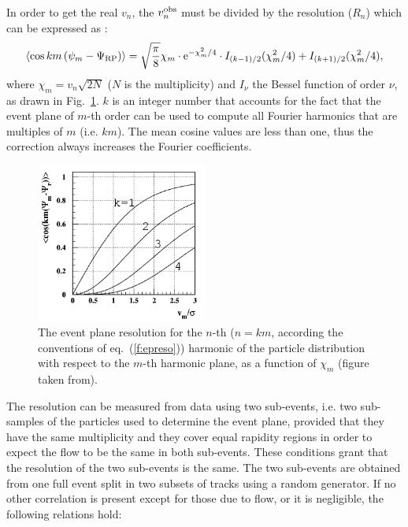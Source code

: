 In order to get  the real $v_n$, the  $v_n^{\rm obs}$ must be divided by the resolution ($R_n$) which can be expressed as \cite{Poskanzer:1998yz}:
\begin{equation}
\label{f:epreso}
\left\langle \cos km\left( \psi_m-\Psi_{\rm RP}\right)\right\rangle = \sqrt{\dfrac{\pi }{8}} \chi_m \cdot {\rm e}^{-\chi_m^2/4} \cdot I_{(k-1)/2}(\chi_m^2/4)+I_{(k+1)/2}(\chi_m^2/4),
\end{equation}
where $\chi_m=v_n\sqrt{2N}$ ($N$ is the multiplicity) and $I_\nu$ the Bessel function of order $\nu$, as drawn in Fig.~\ref{fig:resoBessel}.
$k$ is an integer number that accounts for the fact that the event plane of $m$-th order can be used to compute all Fourier harmonics that are multiples
of $m$ (i.e. $km$).
The mean cosine values are less than one, thus the correction always increases the Fourier coefficients.

\begin{figure}
\centering
 \includegraphics[width=0.5\textwidth]{FigCap5/resolBessel.png}
 \caption[Event plane resolution vs $\chi_m$]{The event plane resolution for the $n$-th ($n=km$, according the conventions of eq.~(\ref{f:epreso})) harmonic of the particle distribution with respect to the $m$-th harmonic plane, as a function of $\chi_m$ (figure taken from).}
 \label{fig:resoBessel}
\end{figure}

The resolution can be measured from data using two sub-events, i.e. two
sub-samples of the particles used to determine the event plane,
provided that they have the same multiplicity and they cover equal rapidity regions in order to expect the flow to be the same in both sub-events.  These conditions grant that the resolution of the two sub-events is the same. The two sub-events are obtained from one full event split in two subsets of tracks using a random generator. If no other correlation is present except for those due to flow, or it is negligible, the following relations hold:

